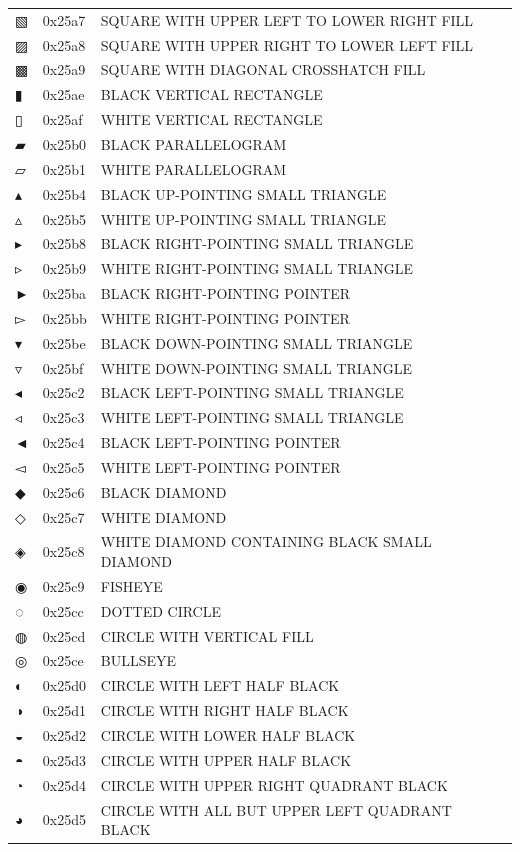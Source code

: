 \documentclass[12pt, twoside]{article}
\begin{document}
\begin{longtable}{L{1.0cm} L{2.0cm} >{\footnotesize}L{10cm}}
$▧$&0x25a7&SQUARE WITH UPPER LEFT TO LOWER RIGHT FILL\\
$▨$&0x25a8&SQUARE WITH UPPER RIGHT TO LOWER LEFT FILL\\
$▩$&0x25a9&SQUARE WITH DIAGONAL CROSSHATCH FILL\\
$▮$&0x25ae&BLACK VERTICAL RECTANGLE\\
$▯$&0x25af&WHITE VERTICAL RECTANGLE\\
$▰$&0x25b0&BLACK PARALLELOGRAM\\
$▱$&0x25b1&WHITE PARALLELOGRAM\\
$▴$&0x25b4&BLACK UP-POINTING SMALL TRIANGLE\\
$▵$&0x25b5&WHITE UP-POINTING SMALL TRIANGLE\\
$▸$&0x25b8&BLACK RIGHT-POINTING SMALL TRIANGLE\\
$▹$&0x25b9&WHITE RIGHT-POINTING SMALL TRIANGLE\\
$►$&0x25ba&BLACK RIGHT-POINTING POINTER\\
$▻$&0x25bb&WHITE RIGHT-POINTING POINTER\\
$▾$&0x25be&BLACK DOWN-POINTING SMALL TRIANGLE\\
$▿$&0x25bf&WHITE DOWN-POINTING SMALL TRIANGLE\\
$◂$&0x25c2&BLACK LEFT-POINTING SMALL TRIANGLE\\
$◃$&0x25c3&WHITE LEFT-POINTING SMALL TRIANGLE\\
$◄$&0x25c4&BLACK LEFT-POINTING POINTER\\
$◅$&0x25c5&WHITE LEFT-POINTING POINTER\\
$◆$&0x25c6&BLACK DIAMOND\\
$◇$&0x25c7&WHITE DIAMOND\\
$◈$&0x25c8&WHITE DIAMOND CONTAINING BLACK SMALL DIAMOND\\
$◉$&0x25c9&FISHEYE\\
$◌$&0x25cc&DOTTED CIRCLE\\
$◍$&0x25cd&CIRCLE WITH VERTICAL FILL\\
$◎$&0x25ce&BULLSEYE\\
$◐$&0x25d0&CIRCLE WITH LEFT HALF BLACK\\
$◑$&0x25d1&CIRCLE WITH RIGHT HALF BLACK\\
$◒$&0x25d2&CIRCLE WITH LOWER HALF BLACK\\
$◓$&0x25d3&CIRCLE WITH UPPER HALF BLACK\\
$◔$&0x25d4&CIRCLE WITH UPPER RIGHT QUADRANT BLACK\\
$◕$&0x25d5&CIRCLE WITH ALL BUT UPPER LEFT QUADRANT BLACK\\

\end{longtable}
\end{document}
